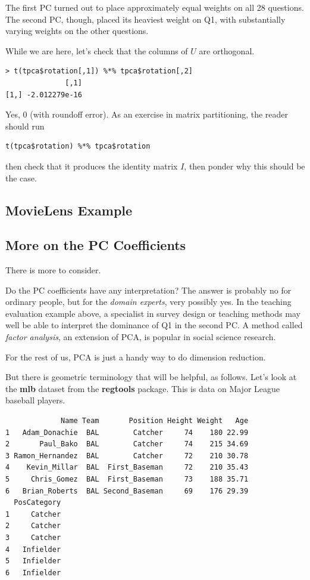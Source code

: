 The first PC turned out to place approximately equal weights on all 28
questions.  The second PC, though, placed its heaviest weight on Q1,
with substantially varying weights on the other questions.

While we are here, let's check that the columns of $U$ are orthogonal.

\begin{lstlisting}
> t(tpca$rotation[,1]) %*% tpca$rotation[,2]
              [,1]
[1,] -2.012279e-16
\end{lstlisting}

Yes, 0 (with roundoff error).  As an exercise in matrix partitioning,
the reader should run

\begin{lstlisting}
t(tpca$rotation) %*% tpca$rotation
\end{lstlisting}

then check that it produces the identity matrix $I$, then ponder why
this should be the case.

\subsection{MovieLens Example}

\subsection{More on the PC Coefficients}
\label{coors}

There is more to consider.

Do the PC coefficients have any interpretation?  The answer is
probably no for ordinary people, but for the \textit{domain experts},
very possibly yes.  In the teaching evaluation example above, a
specialist in survey design or teaching methods may well be able to
interpret the dominance of Q1 in the second PC.  A method called
\textit{factor analysis}, an extension of PCA, is popular in social
science research.

For the rest of us, PCA is just a handy way to do dimension reduction.

But there is geometric terminology that will be helpful, as follows.
Let's look at the \textbf{mlb} dataset from the \textbf{regtools}
package.  This is data on Major League baseball players.

\begin{lstlisting}
             Name Team       Position Height Weight   Age
1   Adam_Donachie  BAL        Catcher     74    180 22.99
2       Paul_Bako  BAL        Catcher     74    215 34.69
3 Ramon_Hernandez  BAL        Catcher     72    210 30.78
4    Kevin_Millar  BAL  First_Baseman     72    210 35.43
5     Chris_Gomez  BAL  First_Baseman     73    188 35.71
6   Brian_Roberts  BAL Second_Baseman     69    176 29.39
  PosCategory
1     Catcher
2     Catcher
3     Catcher
4   Infielder
5   Infielder
6   Infielder
\end{lstlisting}

